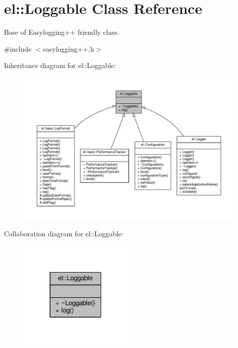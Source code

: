 \hypertarget{classel_1_1Loggable}{}\section{el\+:\+:Loggable Class Reference}
\label{classel_1_1Loggable}


Base of Easylogging++ friendly class.  




{\ttfamily \#include $<$easylogging++.\+h$>$}



Inheritance diagram for el\+:\+:Loggable\+:
\nopagebreak
\begin{figure}[H]
\begin{center}
\leavevmode
\includegraphics[width=350pt]{da/d81/classel_1_1Loggable__inherit__graph}
\end{center}
\end{figure}


Collaboration diagram for el\+:\+:Loggable\+:
\nopagebreak
\begin{figure}[H]
\begin{center}
\leavevmode
\includegraphics[width=157pt]{d5/d1c/classel_1_1Loggable__coll__graph}
\end{center}
\end{figure}
